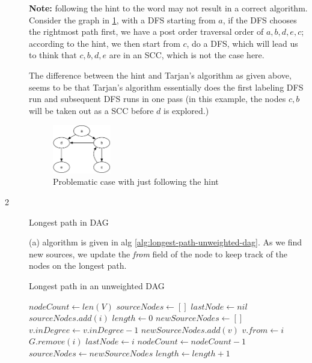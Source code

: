 \documentclass{article}
\begin{document}
\begin{description}
  \textbf{Note:} following the hint to the word may not result in a correct algorithm. Consider the graph in \ref{fig:pb1}, with a DFS starting from $a$, if the DFS chooses the rightmost path first, we have a post order traversal order of $a, b, d, e, c$; according to the hint, we then start from $c$, do a DFS, which will lead us to think that $c, b, d, e$ are in an SCC, which is not the case here. 

  The difference between the hint and Tarjan's algorithm as given above, seems to be that Tarjan's algorithm essentially does the first labeling DFS run and subsequent DFS runs in one pass (in this example, the nodes $c, b$ will be taken out as a SCC before $d$ is explored.)

  \begin{figure}[h]
  \centering
  \includegraphics[width=0.25\textwidth]{hw31case}
  \caption{Problematic case with just following the hint}
  \label{fig:pb1}
  \end{figure}

\item[2]{Longest path in DAG}

  (a) algorithm is given in alg \ref{alg:longest-path-unweighted-dag}. As we find new sources, we update the \textit{from} field of the node to keep track of the nodes on the longest path.

  \begin{algorithm}[h]
  \caption{Longest path in an unweighted DAG}
  \label{alg:longest-path-unweighted-dag}
    \begin{algorithmic}[1]
  
      \State $nodeCount \gets len(V)$
      \State $sourceNodes \gets []$
      \State $lastNode \gets nil$
          \State $sourceNodes.add(i)$
        \EndIf
      \EndFor
      \State $length \gets 0$
        \State $newSourceNodes \gets []$
            \State $v.inDegree \gets v.inDegree - 1$
              \State $newSourceNodes.add(v)$
              \State $v.from \gets i$
            \EndIf
          \EndFor
          \State $G.remove(i)$
          \State $lastNode \gets i$
          \State $nodeCount \gets nodeCount - 1$
        \EndFor
        \State $sourceNodes \gets newSourceNodes$
        \State $length \gets length + 1$
      \EndWhile


\end{algorithmic}
\end{algorithm}
\end{description}
\end{document}
